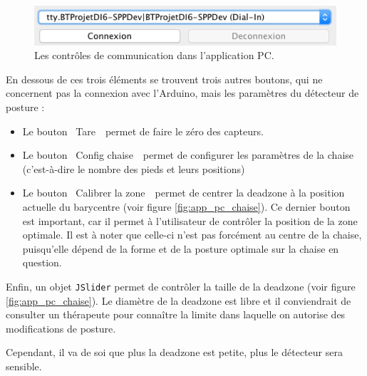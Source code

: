 \documentclass{polytech/polytech}
\begin{document}
\begin{figure}[htbp]
\begin{center}
\includegraphics[width=12cm]{image/app_pc_comms}
\end{center}
\caption{Les contrôles de communication dans l'application PC.}
\label{fig:app_pc_comms}
\end{figure}

En dessous de ces trois éléments se trouvent trois autres boutons, qui ne concernent pas la connexion avec l'Arduino, mais les paramètres du détecteur de posture : 
\begin{itemize}
\item Le bouton \guillemotleft ~Tare~\guillemotright\ permet de faire le zéro des capteurs.
\item Le bouton \guillemotleft ~Config chaise~\guillemotright\ permet de configurer les paramètres de la chaise (c'est-à-dire le nombre des pieds et leurs positions)
\item Le bouton \guillemotleft ~Calibrer la zone~\guillemotright\ permet de centrer la deadzone à la position actuelle du barycentre (voir figure \ref{fig:app_pc_chaise}). Ce dernier bouton est important, car il permet à l'utilisateur de contrôler la position de la zone optimale. 
Il est à noter que celle-ci n'est pas forcément au centre de la chaise, puisqu'elle dépend de la forme et de la posture optimale sur la chaise en question.
\end{itemize}

Enfin, un objet \texttt{JSlider} permet de contrôler la taille de la deadzone (voir figure \ref{fig:app_pc_chaise}). 
Le diamètre de la deadzone est libre et il conviendrait de consulter un thérapeute pour connaître la limite dans laquelle on autorise des modifications de posture.

Cependant, il va de soi que plus la deadzone est petite, plus le détecteur sera sensible.

\end{document}

